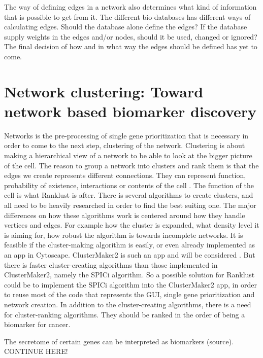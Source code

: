 \documentclass[UKenglish]{ifimaster}
\begin{document}
The way of defining edges in a network also determines what kind of information that is possible to get from it. The
different bio-databases has different ways of calculating edges. Should the database alone define the edges? If the
database supply weights in the edges and/or nodes, should it be used, changed or ignored? The final decision of how and
in what way the edges should be defined has yet to come. 

\chapter{Network clustering: Toward network based biomarker discovery}
Networks is the pre-processing of single gene prioritization that is necessary in order to come to the next step,
clustering of the network. Clustering is about making a hierarchical view of a network to be able to look at the bigger
picture of the cell. The reason to group a network into clusters and rank them is that the edges we create represents
different connections. They can represent function, probability of existence, interactions or contents of the cell
\cite{siri}. The function of the cell is what Ranklust is after. There is several algorithms to create clusters, and all
need to be heavily researched in order to find the best suiting one. The major differences on how these algorithms work
is centered around how they handle vertices and edges. For example how the cluster is expanded, what density level it is
aiming for, how robust the algorithm is towards incomplete networks. It is feasible if the cluster-making algorithm is
easily, or even already implemented as an app in Cytoscape. ClusterMaker2 is such an app and will be considered
\cite{cm2}. But there is faster cluster-creating algorithms than those implemented in ClusterMaker2, namely the SPICi
\cite{spici} algorithm. So a possible solution for Ranklust could be to implement the SPICi algorithm into the
ClusterMaker2 app, in order to reuse most of the code that represents the GUI, single gene prioritization and network
creation. In addition to the cluster-creating algorithms, there is a need for cluster-ranking algorithms. They should be
ranked in the order of being a biomarker for cancer.


The secretome of certain genes can be interpreted as biomarkers (source). CONTINUE HERE!
\end{document}
